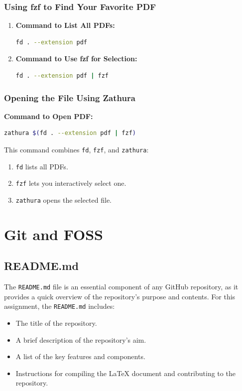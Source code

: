 \documentclass{article}
\begin{document}
\subsubsection{Using fzf to Find Your Favorite PDF}
\begin{enumerate}
  \item \textbf{Command to List All PDFs:}
  \begin{lstlisting}[language=bash]
  fd . --extension pdf
  \end{lstlisting}

  \item \textbf{Command to Use fzf for Selection:}
  \begin{lstlisting}[language=bash]
  fd . --extension pdf | fzf
  \end{lstlisting}
\end{enumerate}

\subsubsection{Opening the File Using Zathura}
\textbf{Command to Open PDF:}
\begin{lstlisting}[language=bash]
zathura $(fd . --extension pdf | fzf)
\end{lstlisting}
This command combines \texttt{fd}, \texttt{fzf}, and \texttt{zathura}:
\begin{enumerate}
    \item \texttt{fd} lists all PDFs.
    \item \texttt{fzf} lets you interactively select one.
    \item \texttt{zathura} opens the selected file.
\end{enumerate}

\newpage

\section{Git and FOSS}
\subsection{README.md}
The \texttt{README.md} file is an essential component of any GitHub repository, as it provides a quick overview of the repository's purpose and contents. For this assignment, the \texttt{README.md} includes:
\begin{itemize}
    \item The title of the repository.
    \item A brief description of the repository's aim.
    \item A list of the key features and components.
    \item Instructions for compiling the \LaTeX{} document and contributing to the repository.
\end{itemize}
\end{document}
